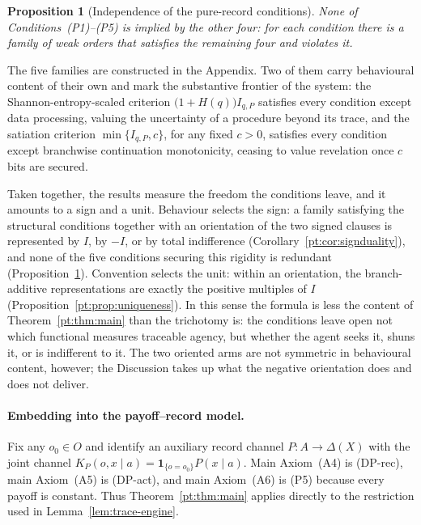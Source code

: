 \documentclass[11pt,a4paper]{article}
\newtheorem{proposition}[theorem]{Proposition}
\theoremstyle{definition}
\newcommand{\Sh}{H}
\newcommand{\1}{\mathbf 1}
\begin{document}
\begin{proposition}[Independence of the pure-record conditions]\label{pt:prop:independence}
None of Conditions~\textup{(P1)}--\textup{(P5)} is implied by the other four: for each condition there is a family of weak
orders that satisfies the remaining four and violates it.
\end{proposition}

The five families are constructed in the Appendix.  Two of them carry behavioural content of their own and mark the
substantive frontier of the system: the Shannon-entropy-scaled criterion $\bigl(1+\Sh(q)\bigr)I_{q,P}$ satisfies every condition
except data processing, valuing the uncertainty of a procedure beyond its trace, and the satiation criterion
$\min\{I_{q,P},c\}$, for any fixed $c>0$, satisfies every condition except branchwise continuation monotonicity, ceasing to value revelation
once $c$ bits are secured.

Taken together, the results measure the freedom the conditions leave, and it amounts to a sign and a unit.  Behaviour
selects the sign: a family satisfying the structural conditions together with an orientation of the two signed clauses is
represented by $I$, by $-I$, or by total indifference (Corollary~\ref{pt:cor:signduality}), and none of the five conditions
securing this rigidity is redundant (Proposition~\ref{pt:prop:independence}).  Convention selects the unit: within an
orientation, the branch-additive representations are exactly the positive multiples of $I$
(Proposition~\ref{pt:prop:uniqueness}).  In this sense the formula is less the content of Theorem~\ref{pt:thm:main} than
the trichotomy is: the conditions leave open not which functional measures traceable agency, but whether the agent seeks
it, shuns it, or is indifferent to it.  The two oriented arms are not symmetric in behavioural content, however; the
Discussion takes up what the negative orientation does and does not deliver.



\paragraph{Embedding into the payoff--record model.}
Fix any $o_0\in O$ and identify an auxiliary record channel
$P:A\to\Delta(X)$ with the joint channel
$K_P(o,x\mid a)=\mathbf 1_{\{o=o_0\}}P(x\mid a)$.  Main Axiom~\textup{(A4)}
is \textup{(DP-rec)}, main Axiom~\textup{(A5)} is \textup{(DP-act)}, and
main Axiom~\textup{(A6)} is \textup{(P5)} because every payoff is constant.
Thus Theorem~\ref{pt:thm:main} applies directly to the restriction used in
Lemma~\ref{lem:trace-engine}.
\end{document}
